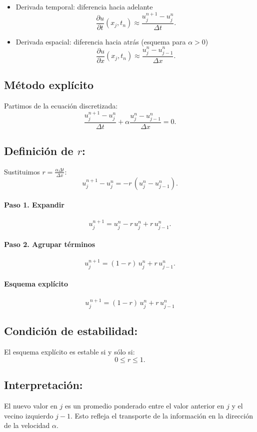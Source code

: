 \documentclass[12pt,a4paper]{article}
\begin{document}
\begin{itemize}
    \item Derivada temporal: diferencia hacia adelante
    \[
    \frac{\partial u}{\partial t}(x_j,t_n) \approx \frac{u_j^{n+1}-u_j^n}{\Delta t}.
    \]

    \item Derivada espacial: diferencia hacia atrás (esquema para $\alpha>0$)
    \[
    \frac{\partial u}{\partial x}(x_j,t_n) \approx \frac{u_j^n - u_{j-1}^n}{\Delta x}.
    \]
\end{itemize}

\subsection{Método explícito}

Partimos de la ecuación discretizada:
\[
\frac{u_j^{n+1}-u_j^n}{\Delta t} + \alpha \frac{u_j^n - u_{j-1}^n}{\Delta x} = 0.
\]

\subsection*{Definición de $r$:}
Sustituimos $r = \tfrac{\alpha \Delta t}{\Delta x}$:
\[
u_j^{n+1}-u_j^n = -r\,(u_j^n - u_{j-1}^n).
\]

\paragraph{Paso 1. Expandir}  
\[
u_j^{n+1} = u_j^n - r\,u_j^n + r\,u_{j-1}^n.
\]

\paragraph{Paso 2. Agrupar términos}  
\[
u_j^{n+1} = (1-r)\,u_j^n + r\,u_{j-1}^n.
\]

\paragraph{Esquema explícito}  
\[
\boxed{u_j^{\,n+1} = (1-r)\,u_j^n + r\,u_{j-1}^n}
\]

\subsection*{Condición de estabilidad:}
El esquema explícito es estable si y sólo si:
\[
0 \leq r \leq 1.
\]

\subsection*{Interpretación:}
El nuevo valor en $j$ es un promedio ponderado entre el valor anterior en $j$ y el vecino izquierdo $j-1$.  
Esto refleja el transporte de la información en la dirección de la velocidad $\alpha$.
\end{document}
